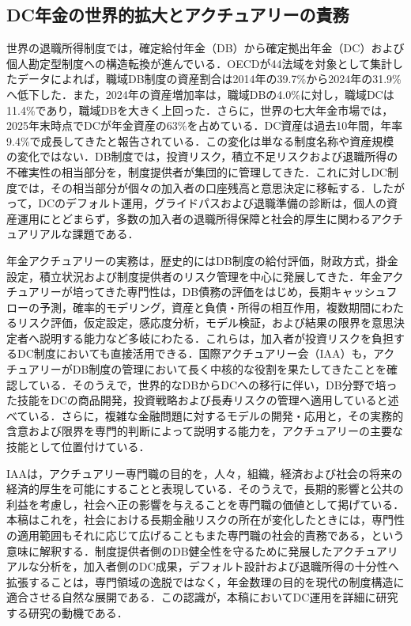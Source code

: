 \documentclass[10pt,a4paper]{article}
\theoremstyle{plain}
\theoremstyle{definition}
\begin{document}
\subsection{DC年金の世界的拡大とアクチュアリーの責務}

世界の退職所得制度では，確定給付年金（DB）から確定拠出年金（DC）および個人勘定型制度への構造転換が進んでいる．OECDが44法域を対象として集計したデータによれば，職域DB制度の資産割合は2014年の39.7\%から2024年の31.9\%へ低下した．また，2024年の資産増加率は，職域DBの4.0\%に対し，職域DCは11.4\%であり，職域DBを大きく上回った\citep{OECD2025PensionMarkets}．さらに，世界の七大年金市場では，2025年末時点でDCが年金資産の63\%を占めている．DC資産は過去10年間，年率9.4\%で成長してきたと報告されている\citep{TAI2026GPAS}．この変化は単なる制度名称や資産規模の変化ではない．DB制度では，投資リスク，積立不足リスクおよび退職所得の不確実性の相当部分を，制度提供者が集団的に管理してきた．これに対しDC制度では，その相当部分が個々の加入者の口座残高と意思決定に移転する．したがって，DCのデフォルト運用，グライドパスおよび退職準備の診断は，個人の資産運用にとどまらず，多数の加入者の退職所得保障と社会的厚生に関わるアクチュアリアルな課題である．

年金アクチュアリーの実務は，歴史的にはDB制度の給付評価，財政方式，掛金設定，積立状況および制度提供者のリスク管理を中心に発展してきた．年金アクチュアリーが培ってきた専門性は，DB債務の評価をはじめ，長期キャッシュフローの予測，確率的モデリング，資産と負債・所得の相互作用，複数期間にわたるリスク評価，仮定設定，感応度分析，モデル検証，および結果の限界を意思決定者へ説明する能力など多岐にわたる．これらは，加入者が投資リスクを負担するDC制度においても直接活用できる．国際アクチュアリー会（IAA）も，アクチュアリーがDB制度の管理において長く中核的な役割を果たしてきたことを確認している．そのうえで，世界的なDBからDCへの移行に伴い，DB分野で培った技能をDCの商品開発，投資戦略および長寿リスクの管理へ適用していると述べている\citep{IAA2021DCRoadmap}．さらに，複雑な金融問題に対するモデルの開発・応用と，その実務的含意および限界を専門的判断によって説明する能力を，アクチュアリーの主要な技能として位置付けている\citep{IAA2013Role}．

IAAは，アクチュアリー専門職の目的を，人々，組織，経済および社会の将来の経済的厚生を可能にすることと表現している．そのうえで，長期的影響と公共の利益を考慮し，社会へ正の影響を与えることを専門職の価値として掲げている\citep{IAA2016Profession}．本稿はこれを，社会における長期金融リスクの所在が変化したときには，専門性の適用範囲もそれに応じて広げることもまた専門職の社会的責務である，という意味に解釈する．制度提供者側のDB健全性を守るために発展したアクチュアリアルな分析を，加入者側のDC成果，デフォルト設計および退職所得の十分性へ拡張することは，専門領域の逸脱ではなく，年金数理の目的を現代の制度構造に適合させる自然な展開である．この認識が，本稿においてDC運用を詳細に研究する研究の動機である．
\end{document}
